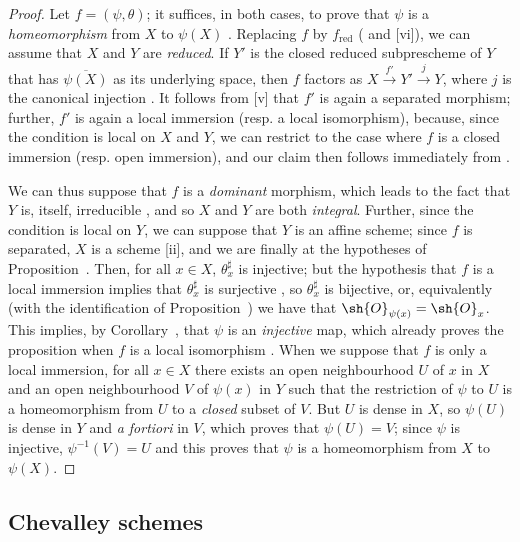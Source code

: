 \begin{proof}
Let $f=(\psi,\theta)$;
it suffices, in both cases, to prove that $\psi$ is a \emph{homeomorphism} from $X$ to $\psi(X)$ .
Replacing $f$ by $f_\text{red}$ ( and [vi]), we can assume that $X$ and $Y$ are \emph{reduced}.
If $Y'$ is the closed reduced subprescheme of $Y$ that has $\overline{\psi(X)}$ as its underlying space, then $f$ factors as $X\xrightarrow{f'}Y'\xrightarrow{j}Y$, where $j$ is the canonical injection .
It follows from [v] that $f'$ is again a separated morphism; further, $f'$ is again
a local immersion (resp. a local isomorphism), because, since the condition is local on $X$ and $Y$, we can restrict to the case where $f$ is a closed immersion (resp. open immersion), and our claim then follows immediately from .

We can thus suppose that $f$ is a \emph{dominant} morphism, which leads to the fact that $Y$ is, itself, irreducible , and so $X$ and $Y$ are both \emph{integral}.
Further, since the condition is local on $Y$, we can suppose that $Y$ is an affine scheme;
since $f$ is separated, $X$ is a scheme [ii], and we are finally at the hypotheses of Proposition~.
Then, for all $x\in X$, $\theta_x^\sharp$ is injective;
but the hypothesis that $f$ is a local immersion implies that $\theta_x^\sharp$ is surjective , so $\theta_x^\sharp$ is bijective, or, equivalently (with the identification of Proposition~) we have that $\sh{O}_{\psi(x)}=\sh{O}_x$.
This implies, by Corollary~, that $\psi$ is an \emph{injective} map, which already proves the proposition when $f$ is a local isomorphism .
When we suppose that $f$ is only a local immersion, for all $x\in X$ there exists an open neighbourhood $U$ of $x$ in $X$ and an open neighbourhood $V$ of $\psi(x)$ in $Y$ such that the restriction of $\psi$ to $U$ is a homeomorphism from $U$ to a \emph{closed} subset of $V$.
But $U$ is dense in $X$, so $\psi(U)$ is dense in $Y$ and \emph{a fortiori} in $V$, which proves that $\psi(U)=V$;
since $\psi$ is injective, $\psi^{-1}(V)=U$ and this proves that $\psi$ is a homeomorphism from $X$ to $\psi(X)$.
\end{proof}

\subsection{Chevalley schemes}
\label{subsection:I.8.3}

